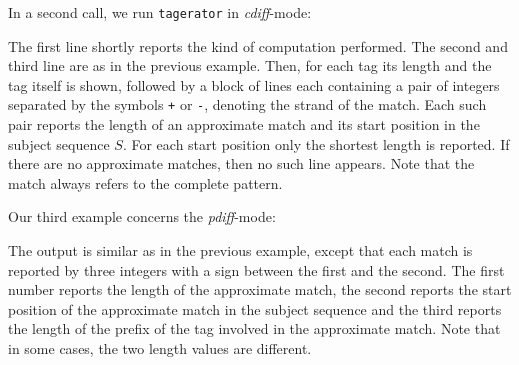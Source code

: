 \documentclass[12pt]{article}
\newcommand{\Program}[0]{\texttt{tagerator}\xspace}
\begin{document}
In a second call, we run \Program in \textit{cdiff}-mode:


The first line shortly reports the kind of computation performed. The second
and third line are as in the previous example. Then, for
each tag its length and the tag itself is shown, followed by 
a block of lines each containing a pair of integers separated by the
symbols \texttt{+} or \texttt{-}, denoting the strand of the match.
Each such pair reports the length of an approximate match and its start 
position in the subject sequence \(S\). For each
start position only the shortest length is reported. If there are no
approximate matches, then no such line appears. Note that the match always
refers to the complete pattern.

Our third example concerns the \textit{pdiff}-mode:


The output is similar as in the previous example, except that each match
is reported by three integers with a sign between the first and the
second. The first number reports the length of the
approximate match, the second reports the start position of the approximate
match in the subject sequence and the third reports the length of the prefix 
of the tag involved in the approximate match. Note that in some cases,
the two length values are different.
\end{document}

